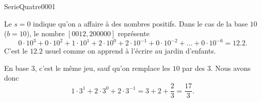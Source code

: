 
\begin{corrige}{SerieQuatre0001}

	Le $s=0$ indique qu'on a affaire à des nombres positifs. Dans le cas de la base $10$ ($b=10$), le nombre $[0012,200000]$ représente
	\begin{equation}
		0\cdot 10^{3}+0\cdot 10^2+1\cdot 10^1+2\cdot 10^0+2\cdot 10^{-1}+0\cdot 10^{-2}+\ldots+0\cdot 10^{-6}=12.2.
	\end{equation}
	C'est le $12.2$ usuel comme on apprend à l'écrire au jardin d'enfants.

	En base $3$, c'est le même jeu, sauf qu'on remplace les $10$ par des $3$. Nous avons donc
	\begin{equation}
		1\cdot 3^1+2\cdot 3^0+2\cdot 3^{-1}=3+2+\frac{ 2 }{ 3 }=\frac{ 17 }{ 3 }.
	\end{equation}

\end{corrige}
